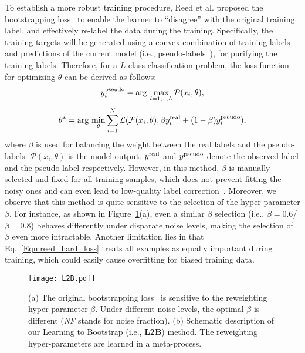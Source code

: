 \documentclass{article}
\newcommand{\argmin}{\arg\,\min}
\newcommand{\argmax}{\arg\,\max}
\begin{document}
To establish a more robust training procedure, Reed et al. proposed the bootstrapping loss~\cite{reed2014training} to enable the learner to ``disagree'' with the original training label, and effectively re-label the data during the training. Specifically, the training targets will be generated using a convex combination of training labels and predictions of the current model (i.e., pseudo-labels~\cite{lee2013pseudo}), for purifying the training labels. Therefore, for a $L$-class classification problem, the loss function for optimizing $\theta$ can be derived as follows:
\begin{equation}
\label{Eqn:pseudo_gt}
y_i^\textup{pseudo} = \argmax_{l=1,..,L} \mathcal{P} (x_i,\theta),
\end{equation}
\begin{equation}
\label{Eqn:reed_hard_loss}
\theta^* = \argmin_\theta \sum_{i=1}^N \mathcal{L}(\mathcal{F} (x_i,\theta), \beta y_i^\textup{real} + (1 - \beta) y_i^\textup{pseudo}),
\end{equation}
where $\beta$ is used for balancing the weight between the real labels and the pseudo-labels. $\mathcal{P} (x_i,\theta)$ is the model output. $y^\textup{real}$ and $y^\textup{pseudo}$ denote the observed label and the pseudo-label respectively.
However, in this method, $\beta$ is manually selected and fixed for all training samples, which does not prevent fitting the noisy ones and can even lead to low-quality label correction~\cite{arazo2019unsupervised}.
Moreover, we observe that this method is quite sensitive to the selection of the hyper-parameter $\beta$.
For instance, as shown in Figure~\ref{fig:overview}(a), even a similar $\beta$ selection (i.e., $\beta=0.6$/$\beta=0.8$) behaves differently under disparate noise levels, making the selection of $\beta$ even more intractable.
Another limitation lies in that Eq.~\eqref{Eqn:reed_hard_loss} treats all examples as equally important during training, which could easily cause overfitting for biased training data.


\begin{figure}[t]
\begin{center}
\texttt{[image: L2B.pdf]}
\end{center}
\vspace{-2em}
  \caption{(a) The original bootstrapping loss~\cite{reed2014training} is sensitive to the reweighting hyper-parameter $\beta$. Under different noise levels, the optimal $\beta$ is different (\emph{NF} stands for noise fraction). (b) Schematic description of our Learning to Bootstrap (i.e., \textbf{L2B}) method. The reweighting hyper-parameters are learned in a meta-process.}
\vspace{-1em}
\label{fig:overview}
\end{figure}
\end{document}
